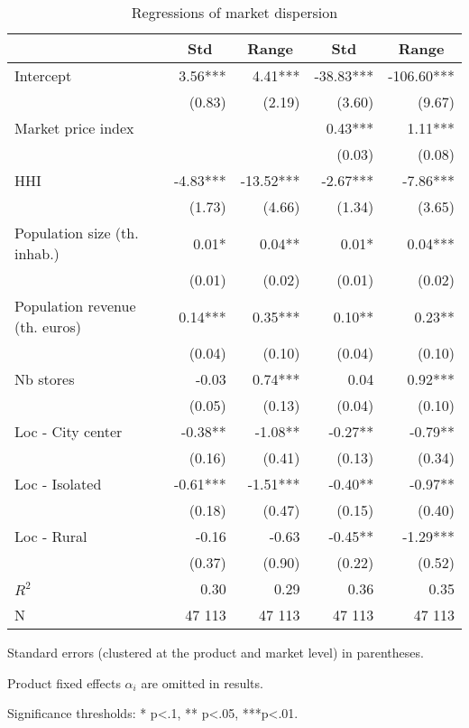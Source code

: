\documentclass[english]{article}
\begin{document}
\begin{table}
\caption{Regressions of market dispersion}
\label{tab:reg_market_dispersion}
\begin{threeparttable}
    \begin{tabular}{lrrrr}
    \toprule
    \toprule
          & \multicolumn{1}{c}{Std} & \multicolumn{1}{c}{Range} & \multicolumn{1}{c}{Std} & \multicolumn{1}{c}{Range} \\
    \midrule
Intercept & 3.56*** & 4.41*** & -38.83*** & -106.60*** \\
      & (0.83) & (2.19) & (3.60) & (9.67) \\
Market price index &       &       & 0.43*** & 1.11*** \\
      &       &       & (0.03) & (0.08) \\
HHI   & -4.83*** & -13.52*** & -2.67*** & -7.86*** \\
      & (1.73) & (4.66) & (1.34) & (3.65) \\
Population size (th. inhab.) & 0.01* & 0.04** & 0.01* & 0.04*** \\
      & (0.01) & (0.02) & (0.01) & (0.02) \\
Population revenue (th. euros) & 0.14*** & 0.35*** & 0.10** & 0.23** \\
      & (0.04) & (0.10) & (0.04) & (0.10) \\
Nb stores & -0.03 & 0.74*** & 0.04  & 0.92*** \\
      & (0.05) & (0.13) & (0.04) & (0.10) \\
Loc - City center & -0.38** & -1.08** & -0.27** & -0.79** \\
      & (0.16) & (0.41) & (0.13) & (0.34) \\
Loc - Isolated & -0.61*** & -1.51*** & -0.40** & -0.97** \\
      & (0.18) & (0.47) & (0.15) & (0.40) \\
Loc - Rural & -0.16 & -0.63 & -0.45** & -1.29*** \\
      & (0.37) & (0.90) & (0.22) & (0.52) \\
\midrule
$R^2$    & 0.30  & 0.29  & 0.36  & 0.35 \\
N     & 47 113 & 47 113 & 47 113 & 47 113 \\
    \bottomrule
    \bottomrule
\end{tabular}
\begin{tablenotes}
      \small
	  \item Standard errors (clustered at the product and market level) in parentheses.
    \item Product fixed effects $\alpha_i$ are omitted in results.
	  \item Significance thresholds: * p<.1, ** p<.05, ***p<.01.
\end{tablenotes}
\end{threeparttable}
\end{table}
\end{document}
